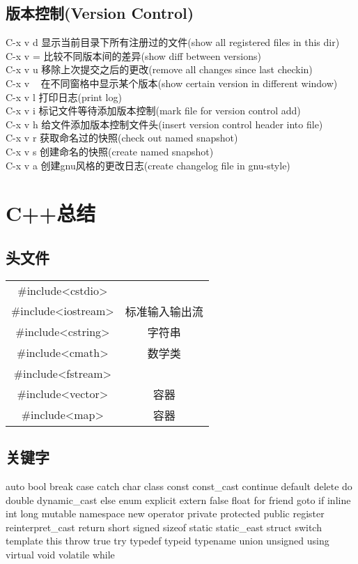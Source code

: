 \documentclass[11pt,a4paper,titlepage]{article}
\begin{document}
{\subsection{\kai 版本控制(Version Control)}
C-x v d 显示当前目录下所有注册过的文件(show all registered files in this dir)\\
C-x v = 比较不同版本间的差异(show diff between versions)\\
C-x v u 移除上次提交之后的更改(remove all changes since last checkin)\\
C-x v ~ 在不同窗格中显示某个版本(show certain version in different window)\\
C-x v l 打印日志(print log)\\
C-x v i 标记文件等待添加版本控制(mark file for version control add)\\
C-x v h 给文件添加版本控制文件头(insert version control header into file)\\
C-x v r 获取命名过的快照(check out named snapshot)\\
C-x v s 创建命名的快照(create named snapshot)\\
C-x v a 创建gnu风格的更改日志(create changelog file in gnu-style)\\

\section{\kai C++总结}
\subsection{\kai 头文件}
\begin{tabular}{cc}
\hline
\#include<cstdio> & \\
\#include<iostream> & 标准输入输出流\\
\#include<cstring> & 字符串\\
\#include<cmath> & 数学类\\
\#include<fstream> & \\
\#include<vector> & 容器\\
\#include<map> & 容器\\
\hline
\end{tabular}

\subsection{\kai 关键字}
auto bool break case catch char class const const\_cast continue default delete do double dynamic\_cast else enum explicit extern false float for friend goto if inline int long mutable namespace new operator private protected public register reinterpret\_cast return short signed sizeof static static\_east struct switch template this throw true try typedef typeid typename union unsigned using virtual void volatile while \\

}
\end{document}
